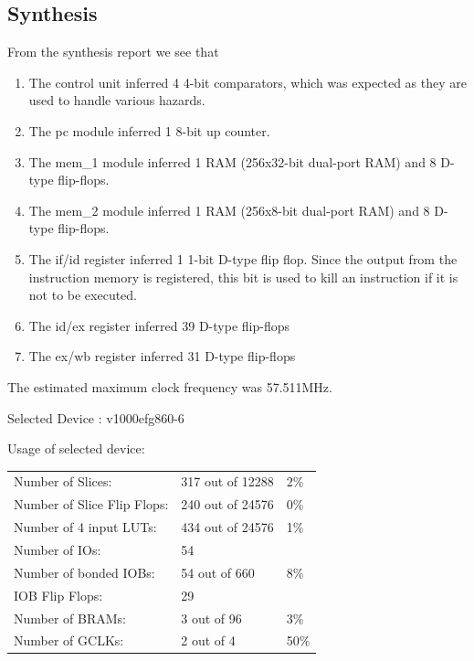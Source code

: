 \documentclass[11pt]{report}
\begin{document}
\subsection*{Synthesis}

From the synthesis report we see that
\begin{enumerate}

\item The control unit inferred 4 4-bit comparators, which was expected as they are used 
to handle various hazards.

\item The pc module inferred 1 8-bit up counter.

\item The mem\_1 module inferred 1 RAM (256x32-bit dual-port RAM) and 8 D-type flip-flops.

\item The mem\_2 module inferred 1 RAM (256x8-bit dual-port RAM) and 8 D-type flip-flops.

\item The if/id register inferred 1 1-bit D-type flip flop. Since the output from the 
instruction memory is registered, this bit is used to kill an instruction if it is not
to be executed.

\item The id/ex register inferred 39 D-type flip-flops

\item The ex/wb register inferred 31 D-type flip-flops

\end{enumerate}

The estimated maximum clock frequency was 57.511MHz.

Selected Device : v1000efg860-6 

Usage of selected device:
\begin{table}[h]
  \centering
  \begin{tabular}{|l|l|l|} 
    \hline
	Number of Slices:                 &  317  out of  12288 &    2\% \\  
	Number of Slice Flip Flops:       &  240  out of  24576 &    0\% \\
	Number of 4 input LUTs:           &  434  out of  24576 &    1\% \\
	Number of IOs:                    &   54                &        \\
	Number of bonded IOBs:            &   54  out of    660 &    8\% \\
	IOB Flip Flops:                   &   29                &        \\
	Number of BRAMs:                  &    3  out of     96 &    3\% \\
	Number of GCLKs:                  &    2  out of      4 &   50\% \\
    \hline
  \end{tabular}
\end{table}
\end{document}
